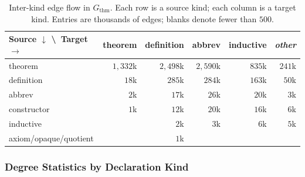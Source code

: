 \begin{table}[H]
\centering
\caption{Inter-kind edge flow in $G_{\mathrm{thm}}$. Each row is a source kind; each column is a target kind. Entries are thousands of edges; blanks denote fewer than $500$.}
\label{tab:inter-kind-flow}
\small
\begin{tabular}{l*{5}{r}}
\toprule
Source $\downarrow$ \textbackslash\ Target $\rightarrow$ & theorem & definition & abbrev & inductive & \textit{other} \\
\midrule
theorem      & $1{,}332$k & $2{,}498$k & $2{,}590$k & $835$k & $241$k \\
definition   & $18$k      & $285$k     & $284$k     & $163$k & $50$k \\
abbrev       & $2$k       & $17$k      & $26$k      & $20$k  & $3$k \\
constructor  & $1$k       & $12$k      & $20$k      & $16$k  & $6$k \\
inductive    &            & $2$k       & $3$k       & $6$k   & $5$k \\
axiom/opaque/quotient &   & $1$k       &            &        & \\
\bottomrule
\end{tabular}
\end{table}

\subsubsection{Degree Statistics by Declaration Kind}

